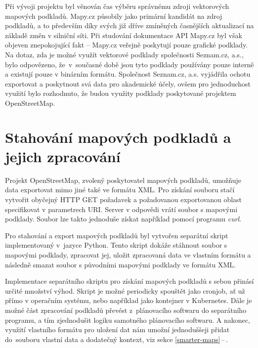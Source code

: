 \documentclass[czech, bachelor]{diploma}
\newcommand{\peteref}[1]{\ref{#1}\,--\,\nameref{#1}}
\begin{document}
Při vývoji projektu byl věnován čas výběru správnému zdroji vektorových mapových podkladů. Mapy.cz působily jako primární kandidát
na zdroj podkladů, a to především díky svých již dříve zmíněných časnějších aktualizací na základě změn v silniční síti.
Při studování dokumentace API Mapy.cz byl však objeven znepokojující fakt -- Mapy.cz veřejně poskytují pouze grafické podklady.
Na dotaz, zda je možné využít vektorové podklady společnosti Seznam.cz, a.s., bylo odpovězeno, že~v~současné době jsou tyto
podklady používány pouze interně a existují pouze v binárním formátu. Společnost Seznam.cz, a.s. vyjádřila ochotu exportovat
a poskytnout svá data pro akademické účely, ovšem pro jednoduchost využití bylo rozhodnuto, že budou využity podklady poskytované
projektem OpenStreetMap.

\section{Stahování mapových podkladů a jejich zpracování}

Projekt OpenStreetMap, zvolený poskytovatel mapových podkladů, umožňuje data exportovat mimo jiné také ve formátu XML\cite{
openstreetmap-export-source, xml-source}. Pro získání souboru stačí vytvořit obyčejný HTTP GET\cite{http-source} požadavek a
požadovanou exportovanou oblast specifikovat v parametrech URI. Server v odpovědi vrátí soubor s mapovými podklady. Soubor lze
takto jednoduše získat například pomocí programu \emph{curl}\cite{curl-source}.

Pro stahování a export mapových podkladů byl vytvořen separátní skript implementovaný v~jazyce Python. Tento skript dokáže
stáhnout soubor s mapovými podklady, zpracovat jej, uložit zpracovaná data ve vlastním formátu a následně smazat soubor
s původními mapovými podklady ve formátu XML\cite{xml-source}.

Implementace separátního skriptu pro získání mapových podkladů s sebou přinásí určité množství výhod. Skript je možné periodicky
spouštět jako cronjob\cite{cron-source}, ať už přímo v operačním systému, nebo například jako kontejner v Kubernetes\cite{
virtualization-source}. Dále je možné část zpracování podkladů převést z~plánovacího softwaru do separátního programu, a tím
zjednodušit logiku samotného plánovacího softwaru. A nakonec, využití vlastního formátu pro uložení dat nám umožní jednoduššeji
přidat do~souboru vlastní data a dodatečný kontext, viz sekce \peteref{smarter-maps}.
\end{document}
